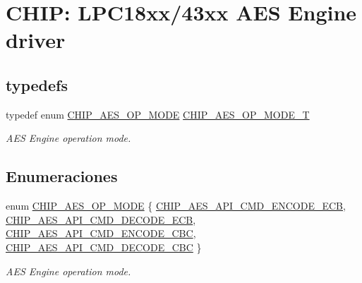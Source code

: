 \hypertarget{group___a_e_s__18_x_x__43_x_x}{}\section{C\+H\+IP\+: L\+P\+C18xx/43xx A\+ES Engine driver}
\label{group___a_e_s__18_x_x__43_x_x}
\subsection*{\textquotesingle{}typedefs\textquotesingle{}}
\begin{DoxyCompactItemize}
\item 
typedef enum \hyperlink{group___a_e_s__18_x_x__43_x_x_gae6ec18c3dfb817d9b4440eaaf6edd3e5}{C\+H\+I\+P\+\_\+\+A\+E\+S\+\_\+\+O\+P\+\_\+\+M\+O\+DE} \hyperlink{group___a_e_s__18_x_x__43_x_x_ga8dd50510d4144a9b12042487fdd42813}{C\+H\+I\+P\+\_\+\+A\+E\+S\+\_\+\+O\+P\+\_\+\+M\+O\+D\+E\+\_\+T}
\begin{DoxyCompactList}\small\item\em A\+ES Engine operation mode. \end{DoxyCompactList}\end{DoxyCompactItemize}
\subsection*{Enumeraciones}
\begin{DoxyCompactItemize}
\item 
enum \hyperlink{group___a_e_s__18_x_x__43_x_x_gae6ec18c3dfb817d9b4440eaaf6edd3e5}{C\+H\+I\+P\+\_\+\+A\+E\+S\+\_\+\+O\+P\+\_\+\+M\+O\+DE} \{ \hyperlink{group___a_e_s__18_x_x__43_x_x_ggae6ec18c3dfb817d9b4440eaaf6edd3e5aaa2c8e546a8d970a23bb38111f272110}{C\+H\+I\+P\+\_\+\+A\+E\+S\+\_\+\+A\+P\+I\+\_\+\+C\+M\+D\+\_\+\+E\+N\+C\+O\+D\+E\+\_\+\+E\+CB}, 
\hyperlink{group___a_e_s__18_x_x__43_x_x_ggae6ec18c3dfb817d9b4440eaaf6edd3e5a33044f589a3b1d9a094d8dd2635b7ed0}{C\+H\+I\+P\+\_\+\+A\+E\+S\+\_\+\+A\+P\+I\+\_\+\+C\+M\+D\+\_\+\+D\+E\+C\+O\+D\+E\+\_\+\+E\+CB}, 
\hyperlink{group___a_e_s__18_x_x__43_x_x_ggae6ec18c3dfb817d9b4440eaaf6edd3e5a86756b506cee0fc90a336bcc0322328c}{C\+H\+I\+P\+\_\+\+A\+E\+S\+\_\+\+A\+P\+I\+\_\+\+C\+M\+D\+\_\+\+E\+N\+C\+O\+D\+E\+\_\+\+C\+BC}, 
\hyperlink{group___a_e_s__18_x_x__43_x_x_ggae6ec18c3dfb817d9b4440eaaf6edd3e5a81bf8f9bd1f4847c05c8ce5c93f1dc1b}{C\+H\+I\+P\+\_\+\+A\+E\+S\+\_\+\+A\+P\+I\+\_\+\+C\+M\+D\+\_\+\+D\+E\+C\+O\+D\+E\+\_\+\+C\+BC}
 \}\begin{DoxyCompactList}\small\item\em A\+ES Engine operation mode. \end{DoxyCompactList}
\end{DoxyCompactItemize}
